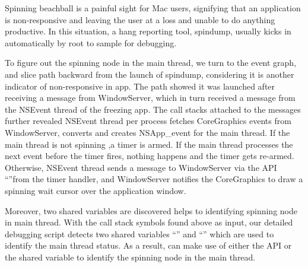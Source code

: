 \indent Spinning beachball is a painful sight for Mac users, signifying that an
application is non-responsive and leaving the user at a loss and unable to do
anything productive. In this situation, a hang reporting tool, spindump, usually
kicks in automatically by root to sample for debugging.

To figure out the spinning node in the main thread, we turn to the event
graph, and slice path backward from the launch of spindump, considering it is
another indicator of non-responsive in app. The path showed it was launched
after receiving a message from WindowServer, which in turn received a message
from the NSEvent thread of the freezing app. The call stacks attached to the
messages further revealed NSEvent thread per process fetches CoreGraphics events
from WindowServer, converts and creates NSApp\_event for the main thread. If the
main thread is not spinning ,a timer is armed. If the main thread processes
the next event before the timer fires, nothing happens and the timer gets
re-armed. Otherwise, NSEvent thread sends a message to WindowServer via the
API ``''from the timer handler, and WindowServer
notifies the CoreGraphics to draw a spinning wait cursor over the application
window.

Moreover, two shared variables are discovered helps \xxx to identifying
spinning node in main thread. With the call stack symbols found above
as input, our detailed debugging script detects two shared variables
``'' and ``'' which
are used to identify the main thread status. As a result, \xxx can make use of
either the API or the shared variable to identify the spinning node in the main
thread.%
